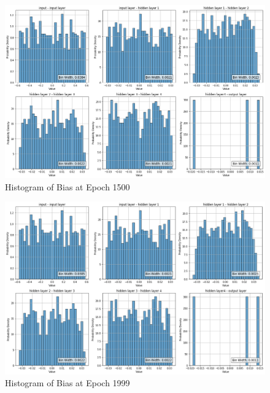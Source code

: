 \documentclass{ioereport}
\begin{document}
    \begin{figure}[H]
        \centering
        \includegraphics[width=\linewidth]{assets/video histogram/epoch1500Bias.png}
        \caption{Histogram of Bias at Epoch 1500}
        \label{fig:video-bias-1500}
    \end{figure}

    \begin{figure}[H]
        \centering
        \includegraphics[width=\linewidth]{assets/video histogram/epoch1999Bias.png}
        \caption{Histogram of Bias at Epoch 1999}
        \label{fig:video-bias-1999}
    \end{figure}
\end{document}
